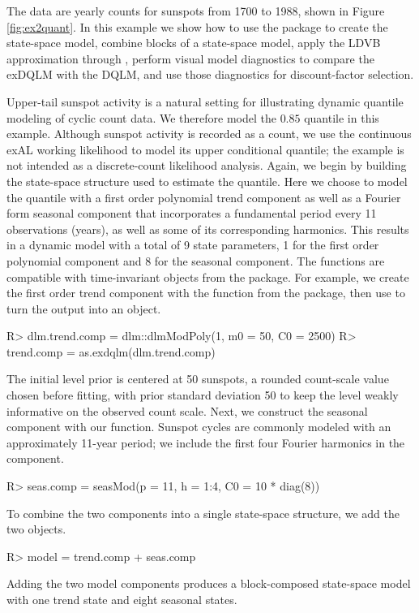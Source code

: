 \documentclass{jss}
\begin{document}
The data are yearly counts for sunspots from 1700 to 1988, shown in Figure \ref{fig:ex2quant}. In this example we show how to use the  package to create the state-space model, combine blocks of a state-space model, apply the LDVB approximation through , perform visual model diagnostics to compare the exDQLM with the DQLM, and use those diagnostics for discount-factor selection.

Upper-tail sunspot activity is a natural setting for illustrating dynamic quantile modeling of cyclic count data. We therefore model the \(0.85\) quantile in this example. Although sunspot activity is recorded as a count, we use the continuous exAL working likelihood to model its upper conditional quantile; the example is not intended as a discrete-count likelihood analysis. Again, we begin by building the state-space structure used to estimate the quantile. Here we choose to model the quantile with a first order polynomial trend component as well as a Fourier form seasonal component that incorporates a fundamental period every 11 observations (years), as well as some of its corresponding harmonics. This results in a dynamic model with a total of 9 state parameters, 1 for the first order polynomial component and 8 for the seasonal component. The  functions are compatible with time-invariant  objects from the  package. For example, we create the first order trend component with the function  from the  package, then use  to turn the output into an  object.
\begin{CodeChunk}
\begin{CodeInput}
R> dlm.trend.comp = dlm::dlmModPoly(1, m0 = 50, C0 = 2500)
R> trend.comp = as.exdqlm(dlm.trend.comp)
\end{CodeInput}
\end{CodeChunk}
The initial level prior is centered at 50 sunspots, a rounded count-scale value chosen before fitting, with prior standard deviation 50 to keep the level weakly informative on the observed count scale. Next, we construct the seasonal component with our  function. Sunspot cycles are commonly modeled with an approximately 11-year period; we include the first four Fourier harmonics in the component.
\begin{CodeChunk}
\begin{CodeInput}
R> seas.comp = seasMod(p = 11, h = 1:4, C0 = 10 * diag(8))
\end{CodeInput}
\end{CodeChunk}
To combine the two components into a single state-space structure, we add the two  objects.
\begin{CodeChunk}
\begin{CodeInput}
R> model = trend.comp + seas.comp
\end{CodeInput}
\end{CodeChunk}
Adding the two model components produces a block-composed state-space model with one trend state and eight seasonal states.
\end{document}
